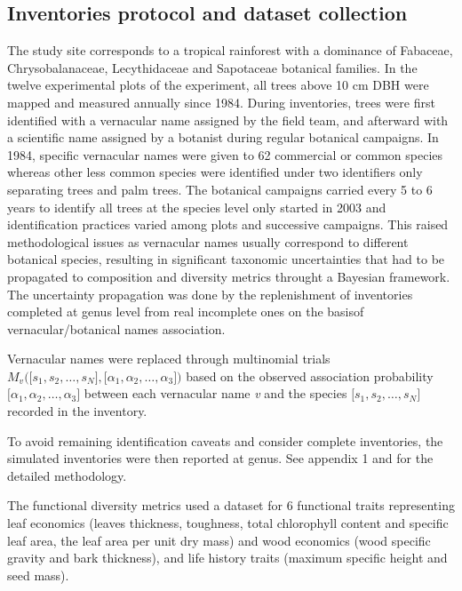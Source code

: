 \documentclass[fleqn,10pt]{ArtEcoFoG} %
\theoremstyle{definition}
\theoremstyle{definition}
\theoremstyle{definition}
\theoremstyle{remark}
\begin{document}
\subsection{Inventories protocol and dataset
collection}\label{inventories-protocol-and-dataset-collection}

The study site corresponds to a tropical rainforest with a dominance of
Fabaceae, Chrysobalanaceae, Lecythidaceae and Sapotaceae botanical
families. In the twelve experimental plots of the experiment, all trees
above 10 cm DBH were mapped and measured annually since 1984. During
inventories, trees were first identified with a vernacular name assigned
by the field team, and afterward with a scientific name assigned by a
botanist during regular botanical campaigns. In 1984, specific
vernacular names were given to 62 commercial or common species whereas
other less common species were identified under two identifiers only
separating trees and palm trees. The botanical campaigns carried every 5
to 6 years to identify all trees at the species level only started in
2003 and identification practices varied among plots and successive
campaigns. This raised methodological issues as vernacular names usually
correspond to different botanical species, resulting in significant
taxonomic uncertainties that had to be propagated to composition and
diversity metrics throught a Bayesian framework. The uncertainty
propagation was done by the replenishment of inventories completed at
genus level from real incomplete ones on the basisof
vernacular/botanical names association.

Vernacular names were replaced through multinomial trials
\(M_v\Big(\big[s_1, s_2, …, s_N\big],\big[\alpha_1, \alpha_2,…, \alpha_3\big]\Big)\)
based on the observed association probability
\(\big[\alpha_1, \alpha_2,…, \alpha_3\big]\) between each vernacular
name \emph{v} and the species \(\big[s_1, s_2, …, s_N\big]\) recorded in
the inventory.

To avoid remaining identification caveats and consider complete
inventories, the simulated inventories were then reported at genus. See
appendix 1 and \citet{Aubry-Kientz2013} for the detailed methodology.

The functional diversity metrics used a dataset for 6 functional traits
representing leaf economics (leaves thickness, toughness, total
chlorophyll content and specific leaf area, the leaf area per unit dry
mass) and wood economics (wood specific gravity and bark thickness), and
life history traits (maximum specific height and seed mass).
\end{document}
